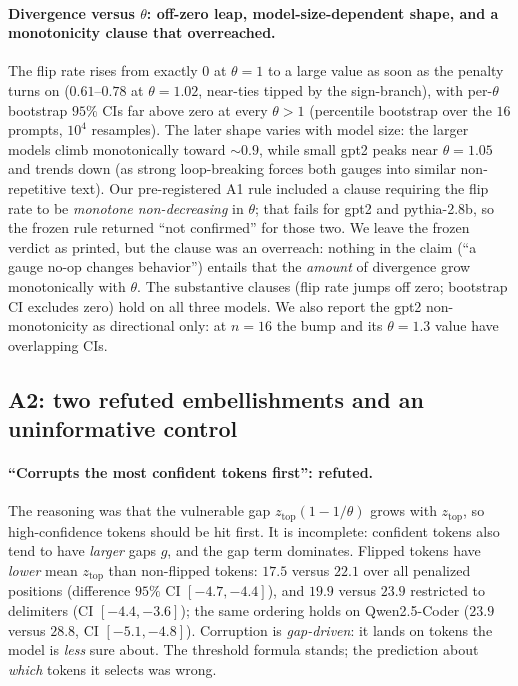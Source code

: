 \documentclass[11pt]{article}
\newcommand{\ztop}{z_{\mathrm{top}}}
\newcommand{\thp}{\theta}
\begin{document}
\paragraph{Divergence versus $\thp$: off-zero leap, model-size-dependent shape, and a
monotonicity clause that overreached.} The flip rate rises from exactly $0$ at $\thp=1$ to a
large value as soon as the penalty turns on ($0.61$--$0.78$ at $\thp=1.02$, near-ties
tipped by the sign-branch), with per-$\thp$ bootstrap $95\%$ CIs far above zero at every
$\thp>1$ (percentile bootstrap over the $16$ prompts, $10^4$ resamples). The later shape varies
with model size: the larger models climb monotonically toward $\sim$$0.9$, while small gpt2
peaks near $\thp=1.05$ and trends down (as strong loop-breaking forces both gauges into similar
non-repetitive text). Our pre-registered A1 rule included a clause requiring the flip rate to be
\emph{monotone non-decreasing} in $\thp$; that fails for gpt2 and pythia-2.8b, so the frozen rule
returned ``not confirmed'' for those two. We leave the frozen verdict as printed, but the clause was
an overreach: nothing in the claim (``a gauge no-op changes behavior'') entails
that the \emph{amount} of divergence grow monotonically with $\thp$. The substantive clauses
(flip rate jumps off zero; bootstrap CI excludes zero) hold on all three models. We also report
the gpt2 non-monotonicity as directional only: at $n=16$ the bump and its $\thp=1.3$ value have
overlapping CIs.

\subsection{A2: two refuted embellishments and an uninformative control}

\paragraph{``Corrupts the most confident tokens first'': refuted.} The reasoning was that the
vulnerable gap $\ztop(1-1/\thp)$ grows with $\ztop$, so high-confidence tokens should be hit
first. It is incomplete: confident tokens also tend to have \emph{larger} gaps $g$, and the gap
term dominates. Flipped tokens have \emph{lower} mean $\ztop$ than non-flipped tokens: $17.5$
versus $22.1$ over all penalized positions (difference $95\%$ CI $[-4.7,-4.4]$), and $19.9$
versus $23.9$ restricted to delimiters (CI $[-4.4,-3.6]$); the same ordering holds on
Qwen2.5-Coder ($23.9$ versus $28.8$, CI $[-5.1,-4.8]$). Corruption is \emph{gap-driven}: it lands
on tokens the model is \emph{less} sure about. The threshold formula stands; the
prediction about \emph{which} tokens it selects was wrong.
\end{document}
